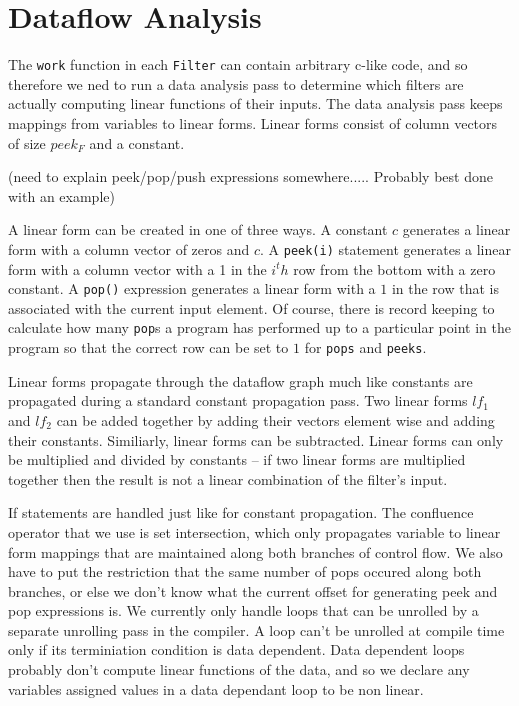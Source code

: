\section{Dataflow Analysis}
The {\tt work} function in each {\tt Filter} can contain arbitrary c-like code, 
and so therefore we ned to run a data analysis pass to determine which filters
are actually computing linear functions of their inputs. The data analysis pass
keeps mappings from variables to linear forms. Linear forms consist of column vectors
of size $peek_{F}$ and a constant.

(need to explain peek/pop/push expressions somewhere.....
 Probably best done with an example)

A linear form can be created in one of three ways. A constant $c$ generates a linear
form with a column vector of zeros and $c$. A {\tt peek(i)} statement generates a linear form
with a column vector with a 1 in the $i^th$ row from the bottom with a zero constant. A
{\tt pop()} expression generates a linear form with a $1$ in the row that is associated with 
the current input element. Of course, there is record keeping to calculate how many {\tt pop}s
a program has performed up to a particular point in the program so that the correct
row can be set to $1$ for {\tt pops} and {\tt peeks}.

Linear forms propagate through the dataflow graph much like constants are propagated
during a standard constant propagation pass. Two linear forms $lf_{1}$ and $lf_{2}$ can
be added together by adding their vectors element wise and adding their constants. Similiarly, 
linear forms can be subtracted. Linear forms can only be multiplied and divided by constants -- if
two linear forms are multiplied together then the result is not a linear combination of the 
filter's input.

If statements are handled just like for constant propagation. The confluence operator that
we use is set intersection, which only propagates variable to linear form mappings that are
maintained along both branches of control flow. We also have to put the restriction that the
same number of pops occured along both branches, or else we don't know what the current offset
for generating peek and pop expressions is. We currently only handle loops that can be unrolled
by a separate unrolling pass in the compiler. A loop can't be unrolled at compile time only if 
its terminiation condition is data dependent. Data dependent loops probably don't compute linear 
functions of the data, and so we declare any variables assigned values in a data dependant loop
to be non linear.

